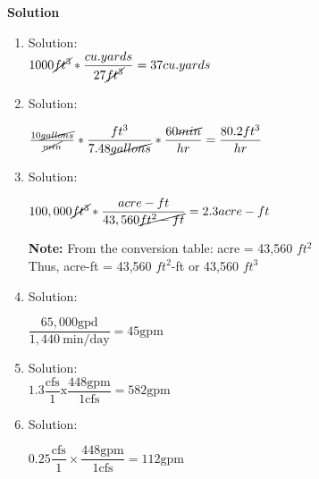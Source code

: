 \documentclass{article}
\begin{document}
\textbf{Solution}
\begin{enumerate}
\item Solution:\\

$1000 \cancel{ft^3}*\dfrac{cu.yards}{27\cancel{ft^3}} = 37 cu.yards$

\item Solution:\\

\vspace{0.4cm}

$\frac{10 \cancel{gallons}}{\cancel{min}}*  \dfrac{ft^3}{7.48 \cancel{gallons}}  * \dfrac{60 \cancel{min}}{hr}   = \dfrac{80.2 ft^3}{hr}$

\vspace{0.4cm}


\item Solution:\\

\vspace{0.4cm}

$100,000 \cancel{ft^3} * \dfrac{acre-ft}{43,560 \cancel{ft^2-ft}} =  2.3 acre-ft$\\

\vspace{0.2cm}

\textbf{Note:} From the conversion table: acre = 43,560 $ft^2$\\
Thus, acre-ft  = 43,560 $ft^2$-ft or 43,560 $ft^3$\\

\vspace{0.4cm}

\item Solution:\\

\vspace{0.4cm}

$
\dfrac{65,000 \mathrm{gpd}}{1,440 \mathrm{~min} / \mathrm{day}}=45 \mathrm{gpm}
$

\vspace{0.4cm}

\item Solution:\\
$
1.3 \dfrac{\mathrm{cfs}}{1} \mathrm{x} \dfrac{448 \mathrm{gpm}}{1 \mathrm{cfs}}=582 \mathrm{gpm}
$

\vspace{0.4cm}

\item Solution:\\

\vspace{0.4cm}

$
0.25 \dfrac{\mathrm{cfs}}{1} \times \dfrac{448 \mathrm{gpm}}{1 \mathrm{cfs}}=112 \mathrm{gpm}
$

\vspace{0.4cm}
\end{enumerate}
\end{document}
